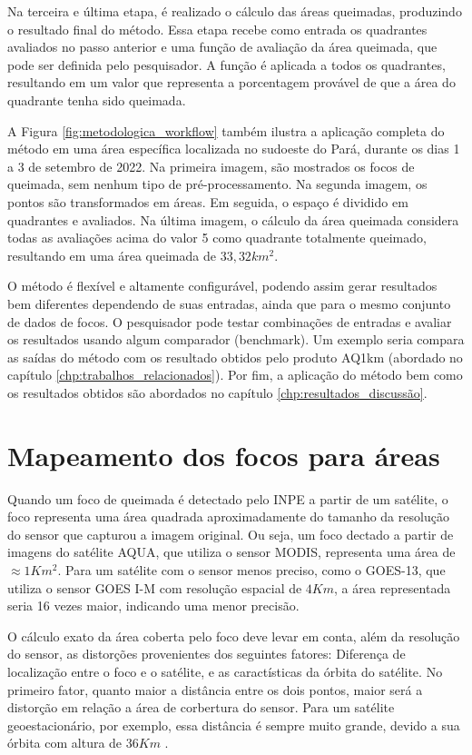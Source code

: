 \documentclass[cic,tc]{iiufrgs}
\begin{document}
Na terceira e última etapa, é realizado o cálculo das áreas queimadas, produzindo o resultado final do método. Essa etapa recebe como entrada os quadrantes avaliados no passo anterior e uma função de avaliação da área queimada, que pode ser definida pelo pesquisador. A função é aplicada a todos os quadrantes, resultando em um valor que representa a porcentagem provável de que a área do quadrante tenha sido queimada.

A Figura \ref{fig:metodologica_workflow} também ilustra a aplicação completa do método em uma área específica localizada no sudoeste do Pará, durante os dias 1 a 3 de setembro de 2022. Na primeira imagem, são mostrados os focos de queimada, sem nenhum tipo de pré-processamento. Na segunda imagem, os pontos são transformados em áreas. Em seguida, o espaço é dividido em quadrantes e avaliados. Na última imagem, o cálculo da área queimada considera todas as avaliações acima do valor 5 como quadrante totalmente queimado, resultando em uma área queimada de $33,32 km^2$.

O método é flexível e altamente configurável, podendo assim gerar resultados bem diferentes dependendo de suas entradas, ainda que para o mesmo conjunto de dados de focos. O pesquisador pode testar combinações de entradas e avaliar os resultados usando algum comparador (benchmark). Um exemplo seria compara as saídas do método com os resultado obtidos pelo produto AQ1km (abordado no capítulo \ref{chp:trabalhos_relacionados}). Por fim, a aplicação do método bem como os resultados obtidos são abordados no capítulo \ref{chp:resultados_discussão}.

\section{Mapeamento dos focos para áreas}

Quando um foco de queimada é detectado pelo INPE a partir de um satélite, o foco representa uma área quadrada aproximadamente do tamanho da resolução do sensor que capturou a imagem original. Ou seja, um foco dectado a partir de imagens do satélite AQUA, que utiliza o sensor MODIS, representa uma área de $\approx1Km^2$. Para um satélite com o sensor menos preciso, como o GOES-13, que utiliza o sensor GOES I-M com resolução espacial de $4Km$, a área representada seria 16 vezes maior, indicando uma menor precisão. \par

O cálculo exato da área coberta pelo foco deve levar em conta, além da resolução do sensor, as distorções provenientes dos seguintes fatores: Diferença de localização entre o foco e o satélite, e as caractísticas da órbita do satélite. No primeiro fator, quanto maior a distância entre os dois pontos, maior será a distorção em relação a área de corbertura do sensor. Para um satélite geoestacionário, por exemplo, essa distância é sempre muito grande, devido a sua órbita com altura de $36Km$ \citep{EmbrapaSatelites}. \par
\end{document}

